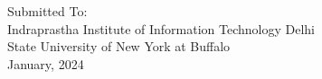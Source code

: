   \vfill
  \begin{center}
  \Large{Submitted To:}\\
    \Large{Indraprastha Institute of Information Technology Delhi} \\
    \Large{State University of New York at Buffalo} \\
    \vspace{0.5cm}
    \Large{January, 2024}
  \end{center}


\newpage
 



 

 
  
  



